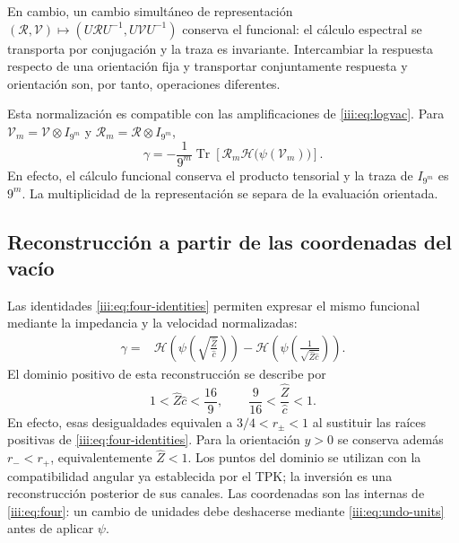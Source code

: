 En cambio, un cambio simultáneo de representación
$(\mathcal R,\mathcal V)\mapsto
(U\mathcal RU^{-1},U\mathcal VU^{-1})$ conserva el funcional:
el cálculo espectral se transporta por conjugación y la traza es
invariante. Intercambiar la respuesta respecto de una orientación fija
y transportar conjuntamente respuesta y orientación son, por tanto,
operaciones diferentes.

Esta normalización es compatible con las amplificaciones de
\eqref{iii:eq:logvac}. Para
$\mathcal V_m=\mathcal V\otimes I_{9^m}$ y
$\mathcal R_m=\mathcal R\otimes I_{9^m}$,
\begin{equation}
 \gamma=-\frac1{9^m}\operatorname{Tr}
 \left[\mathcal R_m\mathcal H\bigl(\psi(\mathcal V_m)\bigr)\right].
 \label{iii:eq:barbero-amplification}
\end{equation}
En efecto, el cálculo funcional conserva el producto tensorial y la traza
de $I_{9^m}$ es $9^m$. La multiplicidad de la representación se separa
de la evaluación orientada.

\subsection{Reconstrucción a partir de las coordenadas del vacío}

Las identidades \eqref{iii:eq:four-identities} permiten expresar el mismo
funcional mediante la impedancia y la velocidad normalizadas:
\begin{align}
 \gamma={}&
 \mathcal H\!\left(\psi\!\left(
     \sqrt{\frac{\widehat Z}{\widehat c}}\right)\right)
 -\mathcal H\!\left(\psi\!\left(
     \frac1{\sqrt{\widehat Z\widehat c}}\right)\right).
 \label{iii:eq:barbero-zc}
\end{align}
El dominio positivo de esta reconstrucción se describe por
\begin{equation}
 1<\widehat Z\widehat c<\frac{16}{9},\qquad
 \frac9{16}<\frac{\widehat Z}{\widehat c}<1.
 \label{iii:eq:barbero-zc-domain}
\end{equation}
En efecto, esas desigualdades equivalen a
$3/4<r_\pm<1$ al sustituir las raíces positivas de
\eqref{iii:eq:four-identities}. Para la orientación $y>0$ se conserva
además $r_-<r_+$, equivalentemente $\widehat Z<1$. Los puntos del
dominio se utilizan con la compatibilidad angular ya establecida por
el TPK; la inversión es una reconstrucción posterior de sus canales.
Las coordenadas son las internas de \eqref{iii:eq:four}: un cambio de
unidades debe deshacerse mediante \eqref{iii:eq:undo-units} antes de
aplicar $\psi$.

